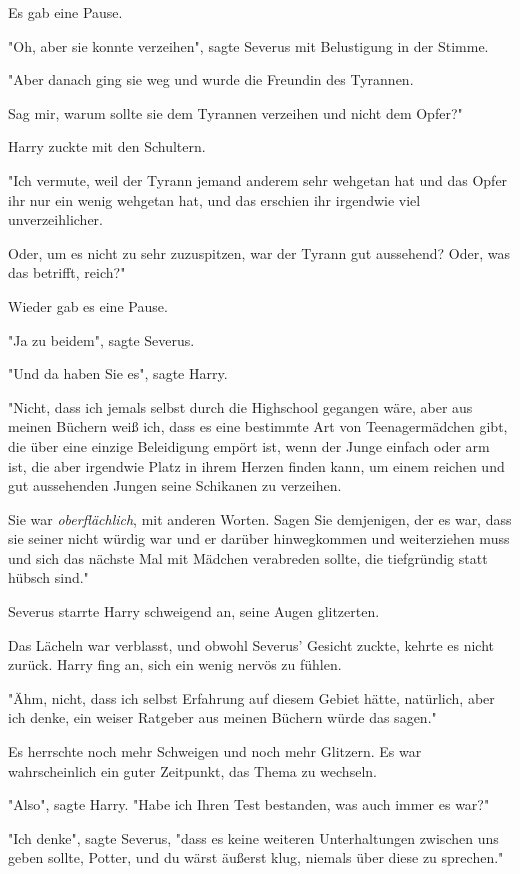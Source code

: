 {Es gab eine Pause.

"Oh, aber sie konnte verzeihen", sagte Severus mit Belustigung in der Stimme.

"Aber danach ging sie weg und wurde die Freundin des Tyrannen.

Sag mir, warum sollte sie dem Tyrannen verzeihen und nicht dem Opfer?"

Harry zuckte mit den Schultern.

"Ich vermute, weil der Tyrann jemand anderem sehr wehgetan hat und das Opfer ihr nur ein wenig wehgetan hat, und das erschien ihr irgendwie viel unverzeihlicher.

Oder, um es nicht zu sehr zuzuspitzen, war der Tyrann gut aussehend? Oder, was das betrifft, reich?"

Wieder gab es eine Pause.

"Ja zu beidem", sagte Severus.

"Und da haben Sie es", sagte Harry.

"Nicht, dass ich jemals selbst durch die Highschool gegangen wäre, aber aus meinen Büchern weiß ich, dass es eine bestimmte Art von Teenagermädchen gibt, die über eine einzige Beleidigung empört ist, wenn der Junge einfach oder arm ist, die aber irgendwie Platz in ihrem Herzen finden kann, um einem reichen und gut aussehenden Jungen seine Schikanen zu verzeihen.

Sie war \emph{oberflächlich}, mit anderen Worten. Sagen Sie demjenigen, der es war, dass sie seiner nicht würdig war und er darüber hinwegkommen und weiterziehen muss und sich das nächste Mal mit Mädchen verabreden sollte, die tiefgründig statt hübsch sind."

Severus starrte Harry schweigend an, seine Augen glitzerten.

Das Lächeln war verblasst, und obwohl Severus' Gesicht zuckte, kehrte es nicht zurück. Harry fing an, sich ein wenig nervös zu fühlen.

"Ähm, nicht, dass ich selbst Erfahrung auf diesem Gebiet hätte, natürlich, aber ich denke, ein weiser Ratgeber aus meinen Büchern würde das sagen."

Es herrschte noch mehr Schweigen und noch mehr Glitzern. Es war wahrscheinlich ein guter Zeitpunkt, das Thema zu wechseln.

"Also", sagte Harry. "Habe ich Ihren Test bestanden, was auch immer es war?"

"Ich denke", sagte Severus, "dass es keine weiteren Unterhaltungen zwischen uns geben sollte, Potter, und du wärst äußerst klug, niemals über diese zu sprechen."

}
